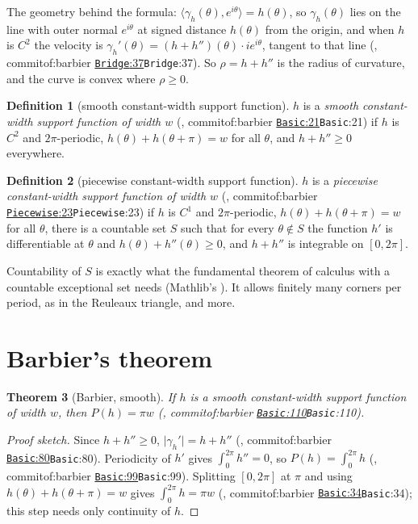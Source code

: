 \documentclass[11pt]{article}
\newtheorem{theorem}{Theorem}
\theoremstyle{definition}
\newtheorem{definition}[theorem]{Definition}
\theoremstyle{remark}
\newcommand{\commitof}[1]{\csname commitof:#1\endcsname}
\newcommand{\repo}[1]{https://github.com/jpbald93/#1}
\newcommand{\src}[4]{\ifcsname commitof:#1\endcsname
  \href{\repo{#1}/blob/\commitof{#1}/#2/#3.lean\#L#4}{\texttt{#3}:#4}\else\texttt{#3}:#4\fi}
\begin{document}
The geometry behind the formula: $\langle\gamma_h(\theta), e^{i\theta}\rangle = h(\theta)$, so
$\gamma_h(\theta)$ lies on the line with outer normal $e^{i\theta}$ at signed distance $h(\theta)$
from the origin, and when $h$ is $C^2$ the velocity is
$\gamma_h'(\theta) = (h+h'')(\theta)\cdot i e^{i\theta}$, tangent to that line
(, \src{barbier}{Barbier}{Bridge}{37}). So $\rho = h+h''$ is the radius
of curvature, and the curve is convex where $\rho\ge 0$.

\begin{definition}[smooth constant-width support function]\label{def:cws}
$h$ is a \emph{smooth constant-width support function of width $w$}
(, \src{barbier}{Barbier}{Basic}{21}) if $h$ is $C^2$ and
$2\pi$-periodic, $h(\theta)+h(\theta+\pi) = w$ for all $\theta$, and $h+h''\ge 0$ everywhere.
\end{definition}

\begin{definition}[piecewise constant-width support function]\label{def:pcw}
$h$ is a \emph{piecewise constant-width support function of width $w$}
(, \src{barbier}{Barbier}{Piecewise}{23}) if $h$ is $C^1$ and
$2\pi$-periodic, $h(\theta)+h(\theta+\pi) = w$ for all $\theta$, there is a countable set $S$ such
that for every $\theta\notin S$ the function $h'$ is differentiable at $\theta$ and
$h(\theta)+h''(\theta)\ge 0$, and $h+h''$ is integrable on $[0,2\pi]$.
\end{definition}

Countability of $S$ is exactly what the fundamental theorem of calculus with a countable exceptional
set needs (Mathlib's ). It
allows finitely many corners per period, as in the Reuleaux triangle, and more.

\section{Barbier's theorem}\label{sec:barbier}

\begin{theorem}[Barbier, smooth]\label{thm:barbier}
If $h$ is a smooth constant-width support function of width $w$, then $P(h) = \pi w$
(, \src{barbier}{Barbier}{Basic}{110}).
\end{theorem}

\begin{proof}[Proof sketch]
Since $h+h''\ge 0$, $\lvert\gamma_h'\rvert = h+h''$ (, \src{barbier}{Barbier}{Basic}{80}). Periodicity of $h'$ gives $\int_0^{2\pi}h'' = 0$, so
$P(h) = \int_0^{2\pi}h$ (, \src{barbier}{Barbier}{Basic}{99}).
Splitting $[0,2\pi]$ at $\pi$ and using $h(\theta)+h(\theta+\pi) = w$ gives $\int_0^{2\pi}h = \pi w$
(, \src{barbier}{Barbier}{Basic}{34}); this step needs only
continuity of $h$.
\end{proof}
\end{document}
